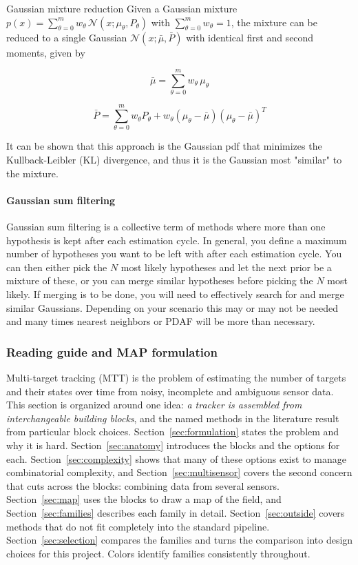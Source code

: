 \begin{definition}{Gaussian mixture reduction}
Given a Gaussian mixture $p(x) = \sum_{\theta=0}^{m} w_\theta \, \mathcal{N}(x; \mu_\theta, P_\theta)$ with $\sum_{\theta=0}^{m} w_\theta = 1$, the mixture can be reduced to a single Gaussian $\mathcal{N}(x; \bar{\mu}, \bar{P})$ with identical first and second moments, given by

\[
\bar{\mu} = \sum_{\theta=0}^{m} w_\theta \, \mu_\theta
\]

\[
\bar{P} = \sum_{\theta=0}^{m} w_\theta P_\theta + w_\theta (\mu_\theta - \bar{\mu})(\mu_\theta - \bar{\mu})^T
\]
\end{definition}

It can be shown that this approach is the Gaussian pdf that minimizes the Kullback-Leibler (KL) divergence, and thus it is the Gaussian most "similar" to the mixture.

\paragraph{Gaussian sum filtering}
Gaussian sum filtering is a collective term of methods where more than one hypothesis is kept after each estimation cycle. In general, you define a maximum number of hypotheses you want to be left with after each estimation cycle. You can then either pick the $N$ most likely hypotheses and let the next prior be a mixture of these, or you can merge similar hypotheses before picking the $N$ most likely. If merging is to be done, you will need to effectively search for and merge similar Gaussians. Depending on your scenario this may or may not be needed and many times nearest neighbors or PDAF will be more than necessary.

\subsubsection{Reading guide and MAP formulation}
Multi-target tracking (MTT) is the problem of estimating the number of targets and their states over time from noisy, incomplete and ambiguous sensor data. This section is organized around one idea: \emph{a tracker is assembled from interchangeable building blocks}, and the named methods in the literature result from particular block choices. Section~\ref{sec:formulation} states the problem and why it is hard. Section~\ref{sec:anatomy} introduces the blocks and the options for each. Section~\ref{sec:complexity} shows that many of these options exist to manage combinatorial complexity, and Section~\ref{sec:multisensor} covers the second concern that cuts across the blocks: combining data from several sensors. Section~\ref{sec:map} uses the blocks to draw a map of the field, and Section~\ref{sec:families} describes each family in detail. Section~\ref{sec:outside} covers methods that do not fit completely into the standard pipeline. Section~\ref{sec:selection} compares the families and turns the comparison into design choices for this project. Colors identify families consistently throughout.

